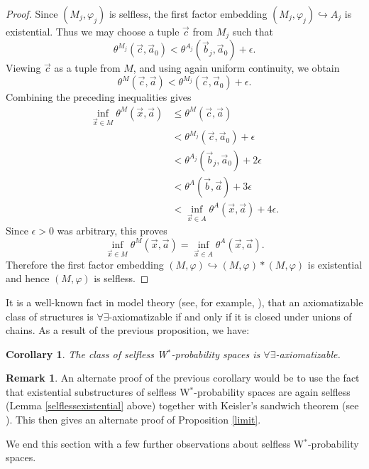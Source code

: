 \documentclass[12pt]{amsart}
\newtheorem{cor}[thm]{Corollary}
\theoremstyle{definition}
\newtheorem{remark}[thm]{Remark}
\begin{document}
\begin{proof}
Since $(M_j,\varphi_j)$ is selfless, the first factor embedding $(M_j,\varphi_j)\hookrightarrow A_j$
is existential. 
Thus we may choose a tuple $\vec c$ from $M_j$ such that
\[
        \theta^{M_j}(\vec c,\vec a_0)
        <
        \theta^{A_j}(\vec b_j,\vec a_0)+\epsilon.
\]
Viewing $\vec c$ as a tuple from $M$, and using again uniform continuity, we obtain
\[
        \theta^M(\vec c,\vec a)
        <
        \theta^{M_j}(\vec c,\vec a_0)+\epsilon.
\]
Combining the preceding inequalities gives
\[
\begin{aligned}
        \inf_{\vec x\in M}\theta^M(\vec x,\vec a)
        &\leq \theta^M(\vec c,\vec a) \\
        &< \theta^{M_j}(\vec c,\vec a_0)+\epsilon \\
        &< \theta^{A_j}(\vec b_j,\vec a_0)+2\epsilon \\
        &< \theta^A(\vec b,\vec a)+3\epsilon \\
        &< \inf_{\vec x\in A}\theta^A(\vec x,\vec a)+4\epsilon.
\end{aligned}
\]
Since $\epsilon>0$ was arbitrary, this proves
\[
        \inf_{\vec x\in M}\theta^M(\vec x,\vec a)
        =
        \inf_{\vec x\in A}\theta^A(\vec x,\vec a).
\]
Therefore the first factor embedding $(M,\varphi)\hookrightarrow (M,\varphi)*(M,\varphi)$
is existential and hence $(M,\varphi)$ is selfless.
\end{proof}

It is a well-known fact in model theory (see, for example, \cite[Proposition 2.4.4]{farah2021model}), that an axiomatizable class of structures is $\forall\exists$-axiomatizable if and only if it is closed under unions of chains.  As a result of the previous proposition, we have:

\begin{cor}\label{selflessAEaxiomatizable}
The class of selfless W$^*$-probability spaces is $\forall\exists$-axiomatizable.
\end{cor}

\begin{remark}
An alternate proof of the previous corollary would be to use the fact that existential substructures of selfless W$^*$-probability spaces are again selfless (Lemma \ref{selflessexistential} above) together with Keisler's sandwich theorem (see \cite[Theorem 4.2]{goldbringhoudayer}).  This then gives an alternate proof of Proposition \ref{limit}.
\end{remark}

We end this section with a few further observations about selfless W$^*$-probability spaces.
\end{document}
